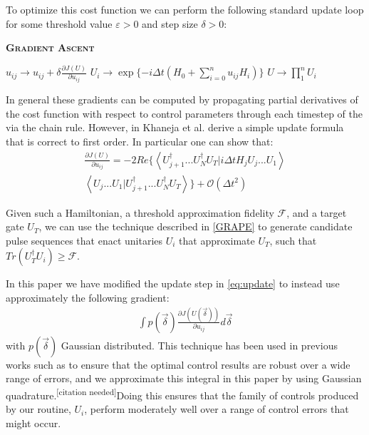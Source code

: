 \documentclass[aps,nofootinbib,pra,notitlepage,twocolumn]{revtex4-1}
\newcommand{\braket}[2]{\left\langle #1 | #2 \right\rangle}
\newcommand{\needcite}{{\color{blue}\textsuperscript{[citation needed]}}}
\begin{document}
To optimize this cost function we can perform the following standard update loop for some threshold value $\varepsilon > 0$ and step size $\delta > 0$:
\begin{algorithm}[H]
  \caption{\textsc{\textbf{Gradient Ascent}}}
  \begin{algorithmic}
    \State $u_{ij} \rightarrow u_{ij} + \delta\frac{\partial J(U)}{\partial u_{ij}}$
    \State $U_i \rightarrow \exp\{-i\Delta t(H_0 + \sum_{i=0}^{n}u_{ij}H_i)\}$
    \EndFor
    \State $U \rightarrow \prod_1^nU_i$
    \EndWhile 
  \end{algorithmic}
\end{algorithm}

In general these gradients can be computed by propagating partial derivatives of the cost function with respect to control parameters through each timestep of the  via the chain rule. However, in \cite{Khaneja2005} Khaneja et al. derive a simple update formula that is correct to first order. In particular one can show that:
\begin{equation}\label{eq:update}
  \begin{split}
\frac{\partial J(U)}{\partial u_{ij}} = -2Re\{\braket{{U_{j+1}^{\dagger}...U_N^{\dagger} U_T}}{i\Delta tH_jU_j...U_1}\\
\braket{U_j...U_1}{U_{j+1}^{\dagger}...U_N^{\dagger} U_T}\} +  \mathcal{O}(\Delta t^2)
  \end{split}
\end{equation}

Given such a Hamiltonian, a threshold approximation fidelity $\mathcal{F}$, and a target gate $U_T$, we can use the technique described in \ref{GRAPE} to generate candidate pulse sequences that enact unitaries $U_i$ that approximate $U_T$, such that $Tr(U_T^{\dagger}U_i) \ge \mathcal{F}$. 

In this paper we have modified the update step in \ref{eq:update} to instead use approximately the following gradient:
\begin{align}\label{quadrature}
\int p(\vec{\delta})\frac{\partial J(U(\vec{\delta}))}{\partial u_{ij}} d\vec{\delta}
\end{align}
with $p(\vec{\delta})$ Gaussian distributed. This technique has been used in previous works such as \cite{Goerz2014} to ensure that the optimal control results are robust over a wide range of errors, and we approximate this integral in this paper by using Gaussian quadrature.\needcite Doing this ensures that the family of controls produced by our routine, $U_i$, perform moderately well over a range of control errors that might occur.
\end{document}
